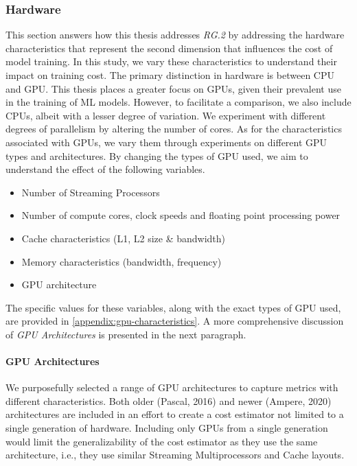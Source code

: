 \subsubsection{Hardware}
\label{subsubsec:4-hardware}
This section answers how this thesis addresses \emph{RG.2} by addressing the hardware characteristics that represent the second dimension that influences the cost of model training. In this study, we vary these characteristics to understand their impact on training cost. The primary distinction in hardware is between CPU and GPU. This thesis places a greater focus on GPUs, given their prevalent use in the training of ML models. However, to facilitate a comparison, we also include CPUs, albeit with a lesser degree of variation. We experiment with different degrees of parallelism by altering the number of cores. As for the characteristics associated with GPUs, we vary them through experiments on different GPU types and architectures. By changing the types of GPU used, we aim to understand the effect of the following variables.
\begin{itemize}
    \item Number of Streaming Processors
    \item Number of compute cores, clock speeds and floating point processing power
    \item Cache characteristics (L1, L2 size \& bandwidth)
    \item Memory characteristics (bandwidth, frequency)
    \item GPU architecture
\end{itemize}
The specific values for these variables, along with the exact types of GPU used, are provided in \autoref{appendix:gpu-characteristics}. A more comprehensive discussion of \textit{GPU Architectures} is presented in the next paragraph.

\paragraph{GPU Architectures}
We purposefully selected a range of GPU architectures to capture metrics with different characteristics. Both older (Pascal, 2016) and newer (Ampere, 2020) architectures are included in an effort to create a cost estimator not limited to a single generation of hardware. Including only GPUs from a single generation would limit the generalizability of the cost estimator as they use the same architecture, i.e., they use similar Streaming Multiprocessors and Cache layouts.

